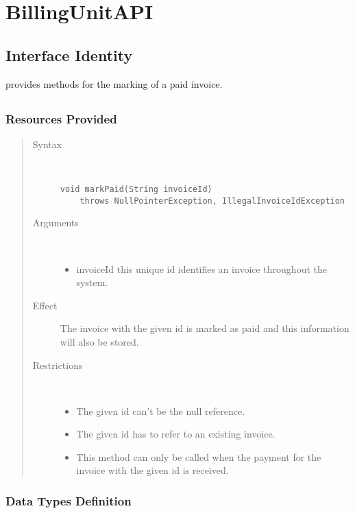 \section{BillingUnitAPI}
\label{api:other-billing-unit-api}

\subsection{Interface Identity}

\npar {} provides methods for the marking of a paid
invoice.

\subsection{}

\subsubsection{Resources Provided}

\begin{quote}
	\begin{description}
		\item[Syntax] \
		\begin{verbatim}
void markPaid(String invoiceId)
    throws NullPointerException, IllegalInvoiceIdException
		\end{verbatim}
		\item[Arguments] \
		\begin{itemize}
		  \item invoiceId this unique id identifies an invoice throughout the system.
		\end{itemize}
		\item[Effect] The invoice with the given id is marked as paid and this
		information will also be stored. 
		\item[Restrictions] \
		\begin{itemize}
		  \item The given id can't be the null reference.
		  \item The given id has to refer to an existing invoice.
		  \item This method can only be called when the payment for the invoice with
		  the given id is received.
		\end{itemize}
	\end{description} 
\end{quote}

\subsubsection{Data Types Definition}

